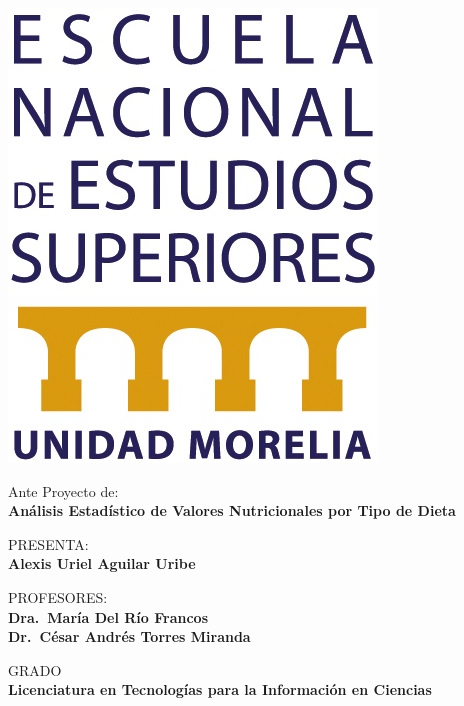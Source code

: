 \documentclass[12pt,a4paper]{article}
\begin{document}
\begin{titlepage}
\begin{minipage}[c]{0.1\textwidth}
        \includegraphics[width=\textwidth]{Resources/logo_enes.jpg}
    \end{minipage}
    \vspace{3cm}

    \centering
    {\large{Ante Proyecto de:\\}}
    {\Large\textbf{Análisis Estadístico de Valores Nutricionales por Tipo de Dieta}}
    \vspace{2cm}

    {{PRESENTA:\\}}
    {\large\textbf{Alexis Uriel Aguilar Uribe}}
    \vspace{1cm} 

    {{PROFESORES:\\}}
    {\large\textbf{Dra.\ María Del Río Francos}}\\
    {\large\textbf{Dr.\ César Andrés Torres Miranda}}
    \vspace{2cm}

    {{GRADO\\}}
    {\large\textbf{Licenciatura en Tecnologías para la Información en Ciencias}}
    \vspace{2cm}


    \vfill
\end{titlepage}
\end{document}
